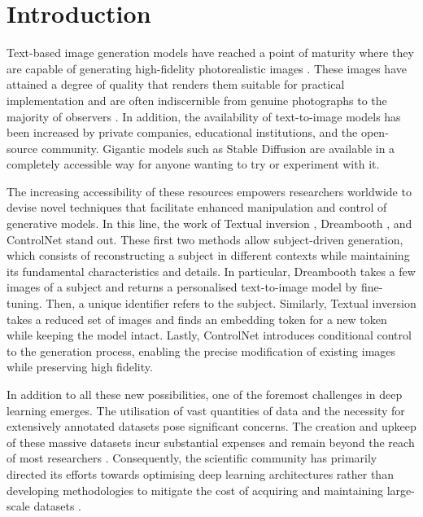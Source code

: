 \chapter{Introduction}

Text-based image generation models have reached a point of maturity where they are capable of generating high-fidelity photorealistic images \cite{ho2020denoising, dhariwal2021diffusion}. These images have attained a degree of quality that renders them suitable for practical implementation and are often indiscernible from genuine photographs to the majority of observers \cite{newyorktimesbelieve}. In addition, the availability of text-to-image models has been increased by private companies, educational institutions, and the open-source community. Gigantic models such as Stable Diffusion are available in a completely accessible way for anyone wanting to try or experiment with it. 

The increasing accessibility of these resources empowers researchers worldwide to devise novel techniques that facilitate enhanced manipulation and control of generative models. In this line, the work of Textual inversion \cite{gal2022image}, Dreambooth \cite{ruiz2023dreambooth}, and ControlNet \cite{zhang2023adding} stand out. These first two methods allow subject-driven generation, which consists of reconstructing a subject in different contexts while maintaining its fundamental characteristics and details. In particular, Dreambooth takes a few images of a subject and returns a personalised text-to-image model by fine-tuning. Then, a unique identifier refers to the subject. Similarly, Textual inversion takes a reduced set of images and finds an embedding token for a new token while keeping the model intact. Lastly, ControlNet introduces conditional control to the generation process, enabling the precise modification of existing images while preserving high fidelity.

In addition to all these new possibilities, one of the foremost challenges in deep learning emerges. The utilisation of vast quantities of data and the necessity for extensively annotated datasets pose significant concerns. The creation and upkeep of these massive datasets incur substantial expenses and remain beyond the reach of most researchers \cite{yang2022image}. Consequently, the scientific community has primarily directed its efforts towards optimising deep learning architectures rather than developing methodologies to mitigate the cost of acquiring and maintaining large-scale datasets \cite{ghiasi2021simple}.

